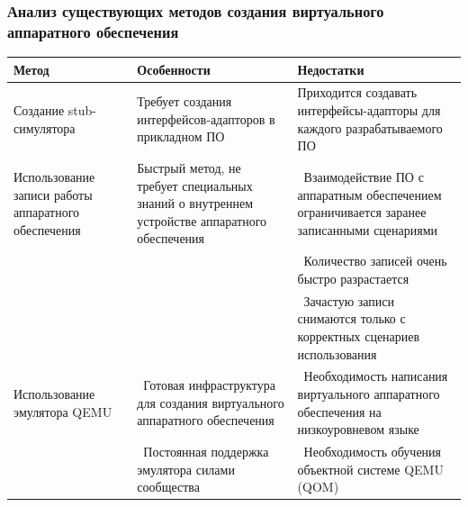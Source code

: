 \begin{frame}%
    \frametitle{Анализ существующих методов создания виртуального аппаратного обеспечения}
    \newcommand{\tabitem}{{\textbullet}~}
        {\footnotesize
            \begin{longtable}{| p{3cm} | p{3cm} | p{4cm} |}
                \hline
                Метод & Особенности & Недостатки \\
                \hline
                    Создание stub-симулятора &
                    Требует создания интерфейсов-адапторов в прикладном ПО &
                    Приходится создавать интерфейсы-адапторы для каждого разрабатываемого ПО \\
                \hline
                    Использование записи работы аппаратного обеспечения &
                    Быстрый метод, не требует специальных знаний о внутреннем устройстве аппаратного обеспечения &
                    \tabitem Взаимодействие ПО с аппаратным обеспечением ограничивается заранее записанными сценариями \\
                \makecell{} & \makecell{} & \tabitem Количество записей очень быстро разрастается \\
                \makecell{} & \makecell{} & \tabitem Зачастую записи снимаются только с корректных сценариев использования \\
                \hline
                Использование эмулятора QEMU &
                \tabitem Готовая инфраструктура для создания виртуального аппаратного обеспечения &
                \tabitem Необходимость написания виртуального аппаратного обеспечения на низкоуровневом языке \\
                \makecell{} &
                \tabitem Постоянная поддержка эмулятора силами сообщества &
                \tabitem Необходимость обучения объектной системе QEMU (QOM) \\
                \hline
            \end{longtable}
        }
\end{frame}


